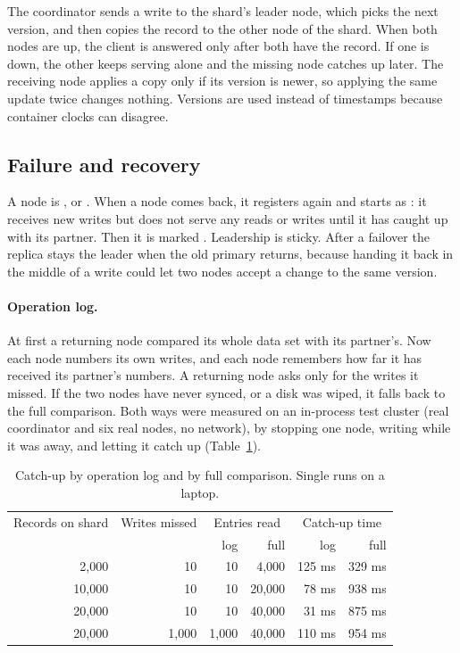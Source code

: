 \documentclass[a4paper,10pt]{article}
\newcommand{\code}[1]{\texttt{\detokenize{#1}}}
\begin{document}
The coordinator sends a write to the shard's leader node, which picks the next version, and then
copies the record to the other node of the shard. When both nodes are up, the client is answered
only after both have the record. If
one is down, the other keeps serving alone and the missing node catches up later. The receiving
node applies a copy only if its version is newer, so applying the same update twice changes
nothing. Versions are used instead of timestamps because container clocks can disagree.

\subsection{Failure and recovery}

A node is \code{UP}, \code{RECOVERING} or \code{DOWN}. When a node comes back, it registers again
and starts as \code{RECOVERING}: it receives new writes but does not serve any reads or writes
until it has caught up with its partner. Then it is marked \code{UP}. Leadership is sticky. After
a failover the replica stays the leader when the old primary returns, because handing it back in
the middle of a write could let two nodes accept a change to the same version.

\paragraph{Operation log.} At first a returning node compared its whole data set with its
partner's. Now each node numbers its own writes, and each node remembers how far it has received
its partner's numbers. A returning node asks only for the writes it missed. If the two nodes have
never synced, or a disk was wiped, it falls back to the full comparison. Both ways were measured on
an in-process test cluster (real coordinator and six real nodes, no network), by stopping one
node, writing while it was away, and letting it catch up (Table~\ref{tab:catchup}).

\begin{table}[htbp]
    \centering
    \small
    \begin{tabular}{rrrrrr}
        \toprule
        Records on shard & Writes missed & \multicolumn{2}{c}{Entries read} & \multicolumn{2}{c}{Catch-up time} \\
        & & log & full & log & full \\
        \midrule
        2,000 & 10 & 10 & 4,000 & 125 ms & 329 ms \\
        10,000 & 10 & 10 & 20,000 & 78 ms & 938 ms \\
        20,000 & 10 & 10 & 40,000 & 31 ms & 875 ms \\
        20,000 & 1,000 & 1,000 & 40,000 & 110 ms & 954 ms \\
        \bottomrule
    \end{tabular}
    \caption{Catch-up by operation log and by full comparison. Single runs on a laptop.}
    \label{tab:catchup}
\end{table}
\end{document}
